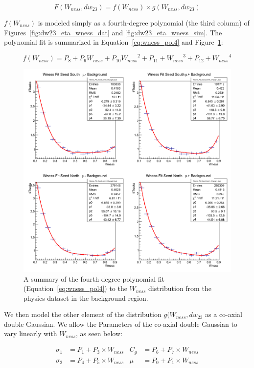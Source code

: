 \begin{equation}
  F(W_{ness},dw_{23}) = f(W_{ness})\times g(W_{ness},dw_{23}) 
  \label{eq:dw23_final_parameterization}
\end{equation}

$f(W_{ness})$ is modeled simply as a fourth-degree polynomial (the third column)
of Figures~\ref{fig:dw23_eta_wness_dat} and \ref{fig:dw23_eta_wness_sim}. The
polynomial fit is summarized in Equation~\ref{eq:wness_pol4} and
Figure~\ref{fig:wness_pol4}:

\begin{equation} \label{eq:wness_pol4}
  f(W_{ness}) = 
  P_8 + P_9 W_{ness} + 
  P_{10} {W_{ness}}^2 +
  P_{11} + {W_{ness}}^3 +
  P_{12} + {W_{ness}}^4
\end{equation}

\begin{figure}
  \centering
  \includegraphics[width=0.7\linewidth]{./figures/c_WnessFit1D.png}
  \caption{
    A summary of the fourth degree polynomial fit (Equation~\ref{eq:wness_pol4})
    to the $W_{ness}$ distribution from the physics dataset in the background
    region.
  }

  \label{fig:wness_pol4}
\end{figure}

We then model the other element of the distribution $g(W_{ness},dw_{23}$ as a
co-axial double Gaussian. We allow the Parameters of the co-axial double
Gaussian to vary linearly with $W_{ness}$, as seen below:

\begin{align}\label{eq_dw23_equations}
  \sigma_1 &= P_1 + P_3 \times W_{ness} &  C_g &= P_6 + P_7 \times W_{ness} \\
  \sigma_2 &= P_4 + P_5 \times W_{ness} &  \mu &= P_0 + P_1 \times W_{ness}
\end{align}

